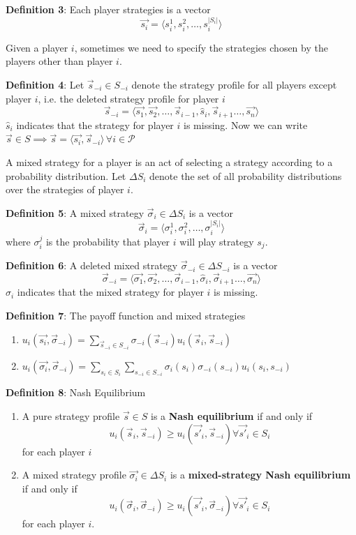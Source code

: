 \documentclass[conference]{IEEEtran}
\begin{document}
\textbf{Definition 3}: Each player strategies is a vector $$\vec{s_i} = \langle s_i^1, s_i^2, \ldots, s_i^{|S_i|}\rangle$$ 
\par Given a player $i$, sometimes we need to specify the strategies chosen by the players other than player $i$. 

\textbf{Definition 4}: Let $\vec{s}_{-i} \in S_{-i}$ denote the strategy profile for all players except player $i$, i.e. the deleted strategy profile for player $i$
$$\vec{s}_{-i} = \langle \vec{s_1}, \vec{s_2}, \ldots, \vec{s}_{i-1}, \hat{s}_{i}, \vec{s}_{i+1} \ldots, \vec{s_n}\rangle$$ $\hat{s}_{i}$ indicates that the strategy for player $i$ is missing.
Now we can write $\vec{s} \in S \implies \vec{s} = \langle \vec{s_i}, \vec{s}_{-i} \rangle \, \forall i \in \mathcal{P} $

\par A mixed strategy for a player is an act of selecting a strategy according to a probability distribution. Let $\Delta S_i$ denote the set of all probability distributions over the strategies of player $i$.

\textbf{Definition 5}: A mixed strategy $\vec{\sigma}_i \in \Delta S_i$ is a vector $$\vec{\sigma}_i = \langle\sigma_i^1, \sigma_i^2, \ldots, \sigma_i^{|S_i|}\rangle$$ where $\sigma_i^j$ is the probability that player $i$ will play strategy $s_j$.

\textbf{Definition 6}: A deleted mixed strategy $\vec{\sigma}_{-i} \in \Delta S_{-i}$ is a vector $$\vec{\sigma}_{-i} = \langle \vec{\sigma_1}, \vec{\sigma_2}, \ldots, \vec{\sigma}_{i-1}, \hat{\sigma}_{i}, \vec{\sigma}_{i+1} \ldots, \vec{\sigma_n}\rangle$$ $\hat{\sigma}_{i}$ indicates that the mixed strategy for player $i$ is missing.

\textbf{Definition 7}: The payoff function and mixed strategies
\begin{enumerate}
\item $u_i(\vec{s_i}, \vec{\sigma}_{-i}) = \displaystyle\sum_{\vec{s}_{-i} \in S_{-i}}\sigma_{-i}(\vec{s}_{-i})u_i(\vec{s}_i, \vec{s}_{-i})$
\item $u_i(\vec{\sigma_i}, \vec{\sigma}_{-i}) = \displaystyle\sum_{s_i \in S_i}\sum_{s_{-i} \in S_{-i}}\sigma_i(s_i)\sigma_{-i}(s_{-i})u_i(s_i, s_{-i})$
\end{enumerate}
\textbf{Definition 8}: Nash Equilibrium
\begin{enumerate}

\item A pure strategy profile $\vec{s} \in S$ is a \textbf{Nash equilibrium} if and only if $$u_i(\vec{s}_i, \vec{s}_{-i}) \geq u_i(\vec{s'}_i, \vec{s}_{-i}) \forall{\vec{s'}_i \in S_i}$$ for each player $i$
\item A mixed strategy profile $\vec{\sigma_i} \in \Delta S_i$ is a \textbf{mixed-strategy Nash equilibrium} if and only if $$u_i(\vec{\sigma}_i, \vec{\sigma}_{-i}) \geq u_i(\vec{s'}_i, \vec{\sigma}_{-i}) \forall{\vec{s'}_i \in S_i}$$ for each player $i$.

\end{enumerate}
\end{document}
